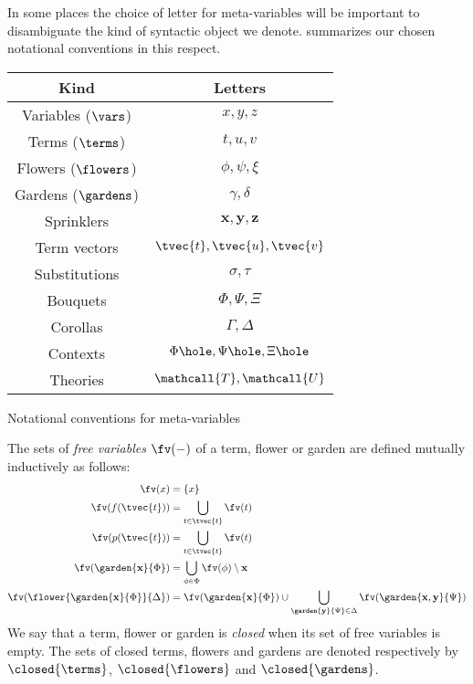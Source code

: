 \begin{remark}
  In some places the choice of letter for meta-variables will be important to
  disambiguate the kind of syntactic object we denote. 
  summarizes our chosen notational conventions in this respect.
\end{remark}

\begin{marginfigure}
  \centering
  \begin{tabular}{|c|c|}
    \hline
    \bfseries Kind & \bfseries Letters \\
    \hline
    Variables ($\vars$) & $x, y, z$ \\
    Terms ($\terms$) & $t, u, v$ \\
    Flowers ($\flowers$) & $\phi, \psi, \xi$ \\
    Gardens ($\gardens$) & $\gamma, \delta$ \\
    Sprinklers & $\mathbf{x}, \mathbf{y}, \mathbf{z}$ \\
    Term vectors & $\tvec{t}, \tvec{u}, \tvec{v}$ \\
    Substitutions & $\sigma, \tau$ \\
    Bouquets & $\Phi, \Psi, \Xi$ \\
    Corollas & $\Gamma, \Delta$ \\
    Contexts & $\Phi\hole, \Psi\hole, \Xi\hole$ \\
    Theories & $\mathcall{T}, \mathcall{U}$ \\
    \hline
  \end{tabular}
  \caption{Notational conventions for meta-variables}
\end{marginfigure}

\begin{definition}\label{def:fv}
  The sets of \emph{free variables} $\fv(-)$ of a term, flower or garden are
  defined mutually inductively as follows:
  \begin{align*}
    \fv(x) &= \{x\} \\
    \fv(f(\tvec{t})) &= \bigcup_{t \in \tvec{t}}{\fv(t)} \\
    \fv(p(\tvec{t})) &= \bigcup_{t \in \tvec{t}}{\fv(t)} \\
    \fv(\garden{\mathbf{x}}{\Phi}) &= \bigcup_{\phi \in \Phi}{\fv(\phi)} \setminus \mathbf{x} \\
    \fv(\flower{\garden{\mathbf{x}}{\Phi}}{\Delta}) &= \fv(\garden{\mathbf{x}}{\Phi}) \cup \bigcup_{\garden{\mathbf{y}}{\Psi} \in \Delta}{\fv(\garden{\mathbf{x}, \mathbf{y}}{\Psi})}
  \end{align*}
  We say that a term, flower or garden is \emph{closed} when its set of free
  variables is empty. The sets of closed terms, flowers and gardens are denoted
  respectively by $\closed{\terms}$, $\closed{\flowers}$ and $\closed{\gardens}$.
\end{definition}

